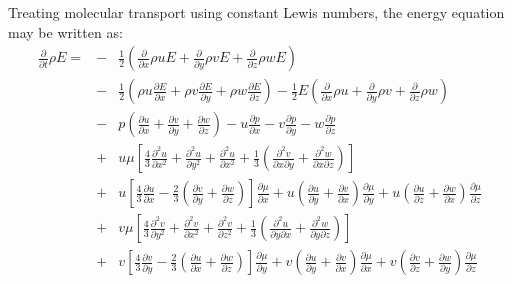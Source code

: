 \documentclass[dvips]{article}
\begin{document}
Treating molecular transport using constant Lewis numbers, the energy equation
may be written as:
\begin{eqnarray}
\frac{\partial}{\partial t}\rho E =
& - & \frac{1}{2}\left(
 \frac{\partial}{\partial x}\rho u E 
+\frac{\partial}{\partial y}\rho v E 
+\frac{\partial}{\partial z}\rho w E
                 \right) \nonumber\\
& - & \frac{1}{2}\left(
 \rho u\frac{\partial E}{\partial x}
+\rho v\frac{\partial E}{\partial y}
+\rho w\frac{\partial E}{\partial z}
                 \right)
-\frac{1}{2}E\left(
 \frac{\partial}{\partial x}\rho u
+\frac{\partial}{\partial y}\rho v
+\frac{\partial}{\partial z}\rho w
             \right) \nonumber\\
& - & p\left(
 \frac{\partial u}{\partial x}
+\frac{\partial v}{\partial y}
+\frac{\partial w}{\partial z}
             \right)
- u\frac{\partial p}{\partial x}
- v\frac{\partial p}{\partial y}
- w\frac{\partial p}{\partial z} \nonumber\\
& + & u\mu\left[
\frac{4}{3}\frac{\partial^{2}u}{\partial x^{2}}
          +\frac{\partial^{2}u}{\partial y^{2}}
          +\frac{\partial^{2}u}{\partial x^{2}}
+\frac{1}{3}\left(
 \frac{\partial^{2}v}{\partial x\partial y}
+\frac{\partial^{2}w}{\partial x\partial z}
            \right)
\right]\nonumber\\
& + & u\left[
\frac{4}{3}\frac{\partial u}{\partial x}
-\frac{2}{3}\left(
 \frac{\partial v}{\partial y}
+\frac{\partial w}{\partial z}
            \right)
      \right]\frac{\partial \mu}{\partial x}
+u\left(
 \frac{\partial u}{\partial y}
+\frac{\partial v}{\partial x}
 \right)\frac{\partial \mu}{\partial y}
+u\left(
 \frac{\partial u}{\partial z}
+\frac{\partial w}{\partial x}
 \right)\frac{\partial \mu}{\partial z}\nonumber\\
& + & v\mu\left[
\frac{4}{3}\frac{\partial^{2}v}{\partial y^{2}}
          +\frac{\partial^{2}v}{\partial x^{2}}
          +\frac{\partial^{2}v}{\partial z^{2}}
+\frac{1}{3}\left(
 \frac{\partial^{2}u}{\partial y\partial x}
+\frac{\partial^{2}w}{\partial y\partial z}
            \right)
\right]\nonumber\\
& + & v\left[
\frac{4}{3}\frac{\partial v}{\partial y}
-\frac{2}{3}\left(
 \frac{\partial u}{\partial x}
+\frac{\partial w}{\partial z}
            \right)
      \right]\frac{\partial \mu}{\partial y}
+v\left(
 \frac{\partial u}{\partial y}
+\frac{\partial v}{\partial x}
 \right)\frac{\partial \mu}{\partial x}
+v\left(
 \frac{\partial v}{\partial z}
+\frac{\partial w}{\partial y}
 \right)\frac{\partial \mu}{\partial z}\nonumber\\

\end{eqnarray}
\end{document}

